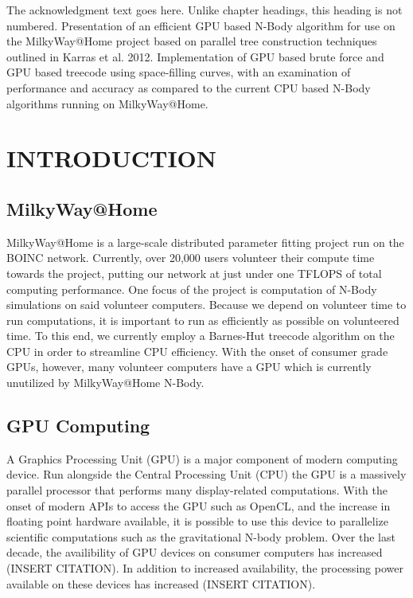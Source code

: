 \documentclass{thesis}
\author{Clayton Rayment}
\begin{document}
 
\titlepage             %
\tableofcontents       %
\listoftables          %
\listoffigures         %

The acknowledgment text goes here. Unlike chapter headings, 
this heading is not numbered.
Presentation of an efficient GPU based N-Body algorithm for use on the MilkyWay@Home project based on parallel tree construction techniques outlined in Karras et al. 2012. Implementation of GPU based brute force and GPU based treecode using space-filling curves, with an examination of performance and accuracy as compared to the current CPU based N-Body algorithms running on MilkyWay@Home.
\chapter{INTRODUCTION}
\section{MilkyWay@Home}
MilkyWay@Home is a large-scale distributed parameter fitting project run on the BOINC network. Currently, over 20,000 users volunteer their compute time towards the project, putting our network at just under one TFLOPS of total computing performance.  One focus of the project is computation of N-Body simulations on said volunteer computers. Because we depend on volunteer time to run computations, it is important to run as efficiently as possible on volunteered time. To this end, we currently employ a Barnes-Hut treecode algorithm on the CPU in order to streamline CPU efficiency. With the onset of consumer grade GPUs, however, many volunteer computers have a GPU which is currently unutilized by MilkyWay@Home N-Body.
\section{GPU Computing}
A Graphics Processing Unit (GPU) is a major component of modern computing device. Run alongside the Central Processing Unit (CPU) the GPU is a massively parallel processor that performs many display-related computations. With the onset of modern APIs to access the GPU such as OpenCL, and the increase in floating point hardware available, it is possible to use this device to parallelize scientific computations such as the gravitational N-body problem. Over the last decade, the availibility of GPU devices on consumer computers has increased (INSERT CITATION). In addition to increased availability, the processing power available on these devices has increased (INSERT CITATION).
\end{document}
